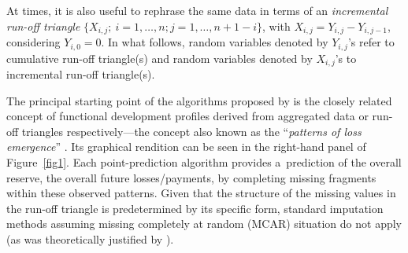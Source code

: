 At times, it is also useful to rephrase the same data in terms of an \emph{incremental run-off triangle} $\{X_{i, j};~i = 1, \dots, n; j = 1, \dots, n + 1 - i\}$, with $X_{i, j} = Y_{i, j} - Y_{i, j - 1}$, considering $Y_{i, 0} = 0$. In what follows, random variables denoted by $Y_{i,j}$'s refer to cumulative run-off triangle(s) and random variables denoted by $X_{i,j}$'s to incremental run-off triangle(s). 

The principal starting point of the algorithms proposed by \cite{MMP2022} is the closely related concept of functional development profiles derived from aggregated data or run-off triangles respectively---the concept also known as the ``\emph{patterns of loss emergence}'' \citep[see][]{Clark2003}. Its graphical rendition can be seen in the right-hand panel of Figure~\ref{fig1}. Each point-prediction algorithm provides a~prediction of the overall reserve, the overall future losses/payments, by completing missing fragments within these observed patterns. Given that the structure of the missing values in the run-off triangle is predetermined by its specific form, standard imputation methods assuming missing completely at random (MCAR) situation do not apply (as was theoretically justified by \citealp{MMP2022}). 
